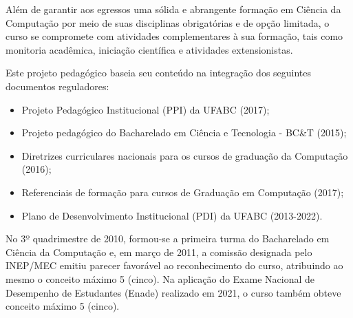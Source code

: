 Além de garantir aos egressos uma sólida e abrangente formação em Ciência da
Computação por meio de suas disciplinas obrigatórias e de opção limitada, o
curso se compromete com atividades complementares à sua formação, tais como
monitoria acadêmica, iniciação científica e atividades extensionistas.

Este projeto pedagógico baseia seu conteúdo na integração dos seguintes
documentos reguladores:
\begin{itemize}
    \item Projeto Pedagógico Institucional (PPI) da UFABC (2017);
    \item Projeto pedagógico do Bacharelado em Ciência e Tecnologia - BC\&T (2015);
    \item Diretrizes curriculares nacionais para os cursos de graduação da Computação (2016);
    \item Referenciais de formação para cursos de Graduação em Computação (2017);
    \item Plano de Desenvolvimento Institucional (PDI) da UFABC (2013-2022).
\end{itemize}

No 3º quadrimestre de 2010, formou-se a primeira turma do Bacharelado em
Ciência da Computação e, em março de 2011, a comissão designada pelo INEP/MEC
emitiu parecer favorável ao reconhecimento do curso, atribuindo ao mesmo o
conceito máximo 5 (cinco).
Na aplicação do Exame Nacional de Desempenho de Estudantes (Enade) realizado em
2021, o curso também obteve conceito máximo 5 (cinco).
